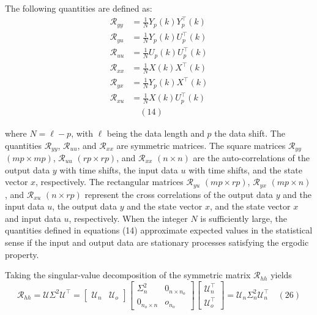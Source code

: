 The following quantities are defined as: 
\begin{align*}
    \mathcal{R}_{yy}&=\frac{1}{N}Y_p(k)Y_p^\top(k)\\
    \mathcal{R}_{yu}&=\frac{1}{N}Y_p(k)U_p^\top(k)\\
    \mathcal{R}_{uu}&=\frac{1}{N}U_p(k)U_p^\top(k)\\
    \mathcal{R}_{xx}&=\frac{1}{N}X(k)X^\top(k)\\
    \mathcal{R}_{yx}&=\frac{1}{N}Y_p(k)X^\top(k)\\
    \mathcal{R}_{xu}&=\frac{1}{N}X(k)U_p^\top(k)\\
    &\quad (14)
\end{align*}

where $N=\ell-p$, with $\ell$ being the data length and $p$ the data shift. 
The quantities $\mathcal{R}_{yy}$, $\mathcal{R}_{uu}$, and $\mathcal{R}_{xx}$ are symmetric matrices. 
The square matrices $\mathcal{R}_{yy}$ $(mp\times mp)$, $\mathcal{R}_{uu}$ $(rp\times rp)$, and $\mathcal{R}_{xx}$ $(n\times n)$ are the auto-correlations of the output data $y$ with time shifts, the input data $u$ with time shifts, and the state vector $x$, respectively. 
The rectangular matrices $\mathcal{R}_{yu}$ $(mp\times rp)$, $\mathcal{R}_{yx}$ $(mp\times n)$, and $\mathcal{R}_{xu}$ $(n\times rp)$ represent the cross correlations of the output data $y$ and the input data $u$, the output data $y$ and the state vector $x$, and the state vector $x$ and input data $u$, respectively. 
When the integer $N$ is sufficiently large, the quantities defined in equations (14) approximate expected values in the statistical sense if the input and output data are stationary processes satisfying the ergodic property. 

Taking the singular-value decomposition of the symmetric matrix $\mathcal{R}_{hh}$ yields 
\[
    \mathcal{R}_{hh}=\mathcal{U}\Sigma^2\mathcal{U}^\top
    =\begin{bmatrix}
        \mathcal{U}_n&\mathcal{U}_o
    \end{bmatrix}
    \begin{bmatrix}
        \Sigma_n^2&0_{n\times n_o}\\
        0_{n_o\times n}&o_{n_o}
    \end{bmatrix}
    \begin{bmatrix}
        \mathcal{U}_n^\top\\
        \mathcal{U}_o^\top
    \end{bmatrix}
    =\mathcal{U}_n\Sigma_n^2\mathcal{U}_n^\top
    \quad (26)
\]

